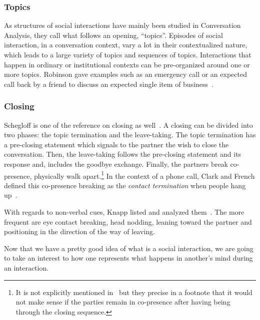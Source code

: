 \documentclass[a4paper,11pt,twoside]{StyleThese}
\begin{document}
\subsubsection{Topics}
As structures of social interactions have mainly been studied in Conversation Analysis, they call what follows an opening, ``topics''. Episodes of social interaction, in a conversation context, vary a lot in their contextualized nature, which leads to a large variety of topics and sequences of topics. Interactions that happen in ordinary or institutional contexts can be pre-organized around one or more topics. Robinson gave examples such as an emergency call or an expected call back by a friend to discuss an expected single item of business~\cite{robinson_overall_2012}. 

\subsubsection{Closing}
Schegloff is one of the reference on closing as well~\cite{schegloff_1973_opening}. A closing can be divided into two phases: the topic termination and the leave-taking.
The topic termination has a pre-closing statement which signals to the partner the wish to close the conversation. Then, the leave-taking follows the pre-closing statement and its response and, includes the goodbye exchange. Finally, the partners break co-presence, \ie physically walk apart.\footnote{It is not explicitly mentioned in~\cite{schegloff_1973_opening}  but they precise in a footnote that it would not make sense if the parties remain in co-presence after having being through the closing sequence.} In the context of a phone call, Clark and French defined this co-presence breaking as the \emph{contact termination} when people hang up~\cite{clark_1981_telephone}.

With regards to non-verbal cues, Knapp \etal{} listed and analyzed them~\cite{knapp_1973_rhetoric}. The more frequent are eye contact breaking, head nodding, leaning toward the partner and positioning in the direction of the way of leaving.

\bigskip

Now that we have a pretty good idea of what is a social interaction, we are going to take an interest to how one represents what happens in another's mind during an interaction.
\end{document}
